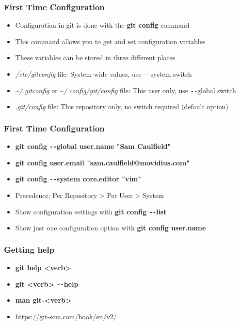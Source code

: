 \documentclass{beamer}
\begin{document}
\begin{frame}
	\frametitle{First Time Configuration}
	\begin{itemize}
		\item{Configuration in git is done with the \textbf{git config} command}
		\item{This command allows you to get and set configuration variables}
		\item{These variables can be stored in three different places}
		\item{\textit{/etc/gitconfig} file: System-wide values, use \texttt{-{}-}system switch}
		\item{\textasciitilde{}\textit{/.gitconfig} or \textasciitilde{}\textit{/.config/git/config} file: This user only, use \texttt{-{}-}global switch}
		\item{\textit{.git/config} file: This repository only, no switch required (default option)}
	\end{itemize}
\end{frame}

\begin{frame}
	\frametitle{First Time Configuration}
	\begin{itemize}
		\item{\textbf{git config \texttt{-{}-}global user.name "Sam Caulfield"}}
		\item{\textbf{git config user.email "sam.caulfield@movidius.com"}}
		\item{\textbf{git config \texttt{-{}-}system core.editor "vim"}}
		\item{Precedence: Per Repository \textgreater{} Per User \textgreater{} System}
		\item{Show configuration settings with \textbf{git config \texttt{-{}-}list}}
		\item{Show just one configuration option with \textbf{git config user.name}}
	\end{itemize}
\end{frame}

\begin{frame}
	\frametitle{Getting help}
	\begin{itemize}
		\item{\textbf{git help \textless{}verb\textgreater{}}}
		\item{\textbf{git \textless{}verb\textgreater{} \texttt{-{}-}help}}
		\item{\textbf{man git-\textless{}verb\textgreater{}}}
		\item{https://git-scm.com/book/en/v2/}
	\end{itemize}
\end{frame}
\end{document}
